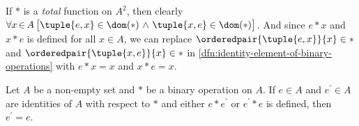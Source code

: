 \begin{notation}
    If \( \ast \) is a \emph{total} function on \( A^{2} \), then clearly
    \( \forall x\,{\in}\,A \, \big[ \tuple{e,x} \in \dom (\ast) \,\,{\land}\,\, \tuple{x,e} \in \dom (\ast) \big] \).
    And since \( e \ast x \) and \( x \ast e \) is defined for all \( x \in A \), we can replace
    \( \orderedpair{\tuple{e,x}}{x} \in \ast \) and \( \orderedpair{\tuple{x,e}}{x} \in \ast \) in \cref{dfn:identity-element-of-binary-operations}
    with \( e \ast x = x \) and \( x \ast e = x \).
\end{notation}

\begin{thm}
    \label{thm:uniqueness-of-identity-element}
    Let \( A \) be a non-empty set and \( \ast \) be a binary operation on \( A \). If \( e \in A \) and \( e^{\prime} \in A \) are
    identities of \( A \) with respect to \( \ast \) and either \( e \ast e^{\prime} \) or \( e^{\prime} \ast e \) is defined, then
    \( e^{\prime} = e \).
\end{thm}

